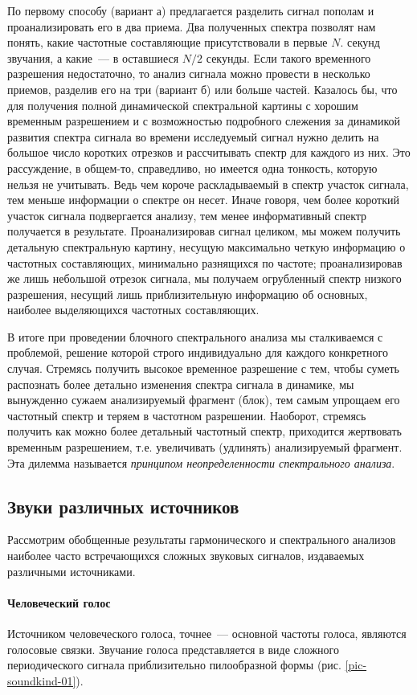 \documentclass[oneside, final, 14pt]{extreport}
\begin{document}
По первому способу (вариант \(а\)) предлагается разделить сигнал пополам и проанализировать его в два приема. Два полученных спектра позволят нам понять, какие частотные составляющие присутствовали в первые \(N\).
секунд звучания, а какие~--- в оставшиеся \(N/2\) секунды. Если такого временного разрешения недостаточно, то анализ сигнала можно провести в несколько приемов, разделив его на три
(вариант \(б\)) или больше частей. Казалось бы, что для получения полной динамической спектральной картины с хорошим временным разрешением и с возможностью подробного слежения за динамикой развития спектра сигнала во времени исследуемый сигнал нужно делить на большое число коротких отрезков и рассчитывать спектр для каждого из них. Это рассуждение, в общем-то, справедливо, но имеется одна тонкость, которую нельзя не учитывать. Ведь чем короче раскладываемый в спектр участок сигнала, тем меньше информации о спектре он несет. Иначе говоря, чем более короткий участок сигнала подвергается анализу, тем менее информативный спектр получается в результате. Проанализировав сигнал целиком, мы
можем получить детальную спектральную картину, несущую максимально четкую информацию о частотных составляющих, минимально разнящихся по частоте; проанализировав же лишь небольшой отрезок сигнала, мы получаем огрубленный спектр низкого разрешения, несущий лишь приблизительную информацию об основных, наиболее выделяющихся частотных составляющих.

В итоге при проведении блочного спектрального анализа мы сталкиваемся с проблемой, решение которой строго индивидуально для каждого конкретного случая. Стремясь получить высокое временное разрешение с тем, чтобы суметь распознать более детально изменения спектра сигнала в динамике, мы вынужденно сужаем анализируемый фрагмент (блок), тем самым упрощаем его частотный спектр и теряем в частотном разрешении. Наоборот, стремясь получить как можно более детальный частотный спектр, приходится жертвовать временным разрешением, т.е. увеличивать (удлинять) анализируемый фрагмент. Эта дилемма называется
{\itshape принципом неопределенности спектрального анализа}.

\subsection{Звуки различных источников}
Рассмотрим обобщенные результаты гармонического и спектрального анализов наиболее часто встречающихся сложных звуковых сигналов, издаваемых различными источниками.
\paragraph{Человеческий голос}
Источником человеческого голоса, точнее~--- основной частоты голоса, являются голосовые связки. Звучание голоса представляется в виде сложного периодического сигнала приблизительно пилообразной формы (рис. \ref{pic-soundkind-01}).
\end{document}
